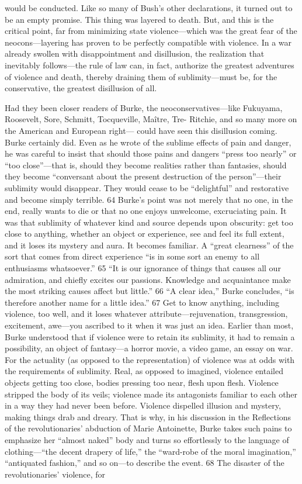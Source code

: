 would be conducted. Like so many of Bush’s other declarations, it turned out to be an empty promise. This thing was layered to death. But, and this is the critical point, far from minimizing state violence—which was the great fear of the neocons—layering has proven to be perfectly compatible with violence. In a war already swollen with disappointment and disillusion, the realization that inevitably follows—the rule of law can, in fact, authorize the greatest adventures of violence and death, thereby draining them of sublimity—must be, for the conservative, the greatest disillusion of all.{\par} Had they been closer readers of Burke, the neoconservatives—like Fukuyama, Roosevelt, Sore, Schmitt, Tocqueville, Maître, Tre- Ritchie, and so many more on the American and European right— could have seen this disillusion coming. Burke certainly did. Even as he wrote of the sublime effects of pain and danger, he was careful to insist that should those pains and dangers “press too nearly” or “too close”—that is, should they become realities rather than fantasies, should they become “conversant about the present destruction of the person”—their sublimity would disappear. They would cease to be “delightful” and restorative and become simply terrible. {\color{blue} 64 } Burke’s point was not merely that no one, in the end, really wants to die or that no one enjoys unwelcome, excruciating pain. It was that sublimity of whatever kind and source depends upon obscurity: get too close to anything, whether an object or experience, see and feel its full extent, and it loses its mystery and aura. It becomes familiar. A “great clearness” of the sort that comes from direct experience “is in some sort an enemy to all enthusiasms whatsoever.” {\color{blue} 65 } “It is our ignorance of things that causes all our admiration, and chiefly excites our passions. Knowledge and acquaintance make the most striking causes affect but little.” {\color{blue} 66 } “A clear idea,” Burke concludes, “is therefore another name for a little idea.” {\color{blue} 67 } Get to know anything, including violence, too well, and it loses whatever attribute—rejuvenation, transgression, excitement, awe—you ascribed to it when it was just an idea. Earlier than most, Burke understood that if violence were to retain its sublimity, it had to remain a possibility, an object of fantasy—a horror movie, a video game, an essay on war. For the actuality (as opposed to the representation) of violence was at odds with the requirements of sublimity. Real, as opposed to imagined, violence entailed objects getting too close, bodies pressing too near, flesh upon flesh. Violence stripped the body of its veils; violence made its antagonists familiar to each other in a way they had never been before. Violence dispelled illusion and mystery, making things drab and dreary. That is why, in his discussion in the Reflections of the revolutionaries’ abduction of Marie Antoinette, Burke takes such pains to emphasize her “almost naked” body and turns so effortlessly to the language of clothing—“the decent drapery of life,” the “ward-robe of the moral imagination,” “antiquated fashion,” and so on—to describe the event. {\color{blue} 68 } The disaster of the revolutionaries’ violence, for 